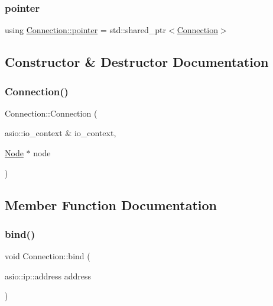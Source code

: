 \subsubsection{\texorpdfstring{pointer}{pointer}}
{\footnotesize\ttfamily using \mbox{\hyperlink{classConnection_a1bb6cd8924ff091e9b053e3368735c9c}{Connection\+::pointer}} =  std\+::shared\+\_\+ptr$<$\mbox{\hyperlink{classConnection}{Connection}}$>$}



\subsection{Constructor \& Destructor Documentation}
\mbox{\label{classConnection_a0679a72f407a3c3fca0cea1cd2cd9eda}} 
\subsubsection{\texorpdfstring{Connection()}{Connection()}}
{\footnotesize\ttfamily Connection\+::\+Connection (\begin{DoxyParamCaption}\item[{asio\+::io\+\_\+context \&}]{io\+\_\+context,  }\item[{\mbox{\hyperlink{classNode}{Node}} $\ast$}]{node }\end{DoxyParamCaption})\hspace{0.3cm}{\ttfamily [private]}}



\subsection{Member Function Documentation}
\mbox{\label{classConnection_a765fb34abf97d31b9c2c49e1e1c76a00}} 
\subsubsection{\texorpdfstring{bind()}{bind()}}
{\footnotesize\ttfamily void Connection\+::bind (\begin{DoxyParamCaption}\item[{asio\+::ip\+::address}]{address }\end{DoxyParamCaption})}



